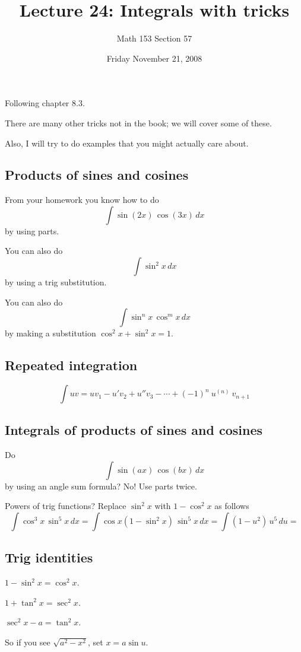 \documentclass[12pt]{article}
\title{Lecture 24: Integrals with tricks}
\author{Math 153 Section 57}
\date{Friday November 21, 2008}
\begin{document}
\maketitle

Following chapter 8.3.

There are many other tricks not in the book; we will cover some of these.

Also, I will try to do examples that you might actually care about.

\subsection*{Products of sines and cosines}

From your homework you know how to do
$$
\int \sin (2x) \, \cos(3x) \, dx
$$
by using parts.

You can also do
$$
\int \sin^2 x \, dx
$$
by using a trig substitution.

You can also do
$$
\int \sin^n x \, \cos^m x \, dx
$$
by making a substitution $\cos^2 x + \sin^2 x = 1$.

\subsection*{Repeated integration}

$$\int uv = u v_1 - u' v_2 + u'' v_3 - \cdots + (-1)^{n}\ u^{(n)} \ v_{n+1}
$$

\subsection*{Integrals of products of sines and cosines}

Do
$$
\int \sin(ax) \, \cos(bx) \, dx
$$
by using an angle sum formula? No!  Use parts twice.

Powers of trig functions?  Replace $\sin^2 x$ with $1 - \cos^2 x$ as follows
$$
\int \cos^3 x \, \sin^5 x \, dx = 
\int \cos x (1 - \sin^2 x) \, \sin^5 x \, dx = 
\int  (1 - u^2) \, u^5 \, du = 
$$

\subsection*{Trig identities}

$1 - \sin^2 x = \cos^2 x$.

$1 + \tan^2 x = \sec^2 x$.

$\sec^2 x - a = \tan^2 x$.

So if you see $\sqrt{a^2 - x^2}$, set $x = a \sin u$.
\end{document}
